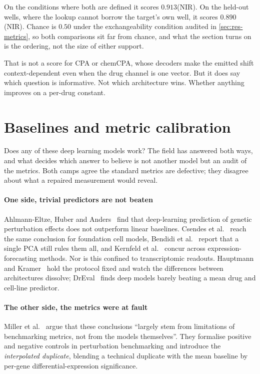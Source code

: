 On the conditions where both are defined it scores $0.913$(NIR). On the held-out wells, where the lookup cannot
borrow the target's own well, it scores $0.890$(NIR). Chance is $0.50$ under the
exchangeability condition audited in \cref{sec:res-metrics}, so both comparisons
sit far from chance, and what the section turns
on is the ordering, not the size of either support.

That is not a score for CPA or chemCPA, whose decoders make the emitted shift
context-dependent even when the drug channel is one vector. But it does say which
question is informative. Not which architecture wins. Whether anything improves
on a per-drug constant.


\section{Baselines and metric calibration}
\label{sec:lit-dispute}
\framedecl{-}

\begin{question}
Does any of these deep learning models work? The field has answered both ways, and what decides which
answer to believe is not another model but an audit of the metrics. Both camps
agree the standard metrics are defective; they disagree about what a repaired
measurement would reveal.
\end{question}

\paragraph{One side, trivial predictors are not beaten}
Ahlmann-Eltze, Huber and Anders~\cite{ahlmanneltze} find that deep-learning
prediction of genetic perturbation effects does not outperform linear baselines.
Csendes et al.~\cite{csendes} reach the same conclusion for foundation cell
models, Bendidi et al.~\cite{bendidi} report that a single PCA still rules them
all, and Kernfeld et al.~\cite{kernfeld} concur across expression-forecasting
methods. Nor is this confined to transcriptomic readouts. Hauptmann and
Kramer~\cite{hauptmann} hold the protocol fixed and watch the differences between
architectures dissolve; DrEval~\cite{dreval} finds deep models barely beating a
mean drug and cell-line predictor.

\paragraph{The other side, the metrics were at fault} Miller et
al.~\cite{miller} argue that these conclusions ``largely stem from limitations of
benchmarking metrics, not from the models themselves''. They formalise positive
and negative controls in perturbation benchmarking and introduce the
\emph{interpolated duplicate}, blending a technical duplicate with the mean
baseline by per-gene differential-expression
significance.

